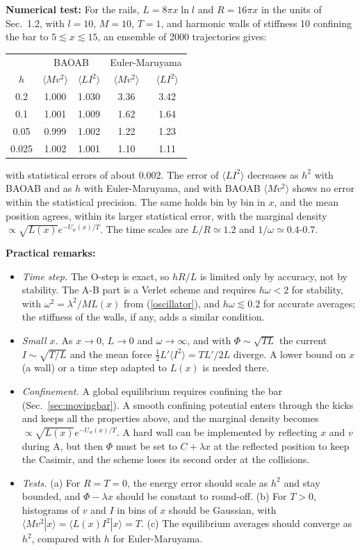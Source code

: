 \documentclass[11pt]{article}
\begin{document}
{\bf Numerical test:} For the rails, $L=8\pi x\ln l$ and $R=16\pi x$ in the units of Sec.~1.2, with $l=10$, $M=10$, $T=1$, and harmonic walls of stiffness 10 confining the bar to $5\lesssim x\lesssim15$, an ensemble of 2000 trajectories gives:
\begin{center}
\begin{tabular}{c|cc|cc}
  & \multicolumn{2}{c|}{BAOAB} & \multicolumn{2}{c}{Euler-Maruyama}\\
  $h$ & $\langle Mv^2\rangle$ & $\langle LI^2\rangle$ & $\langle Mv^2\rangle$ & $\langle LI^2\rangle$\\\hline
  0.2 & 1.000 & 1.030 & 3.36 & 3.42\\
  0.1 & 1.001 & 1.009 & 1.62 & 1.64\\
  0.05 & 0.999 & 1.002 & 1.22 & 1.23\\
  0.025 & 1.002 & 1.001 & 1.10 & 1.11
\end{tabular}
\end{center}
with statistical errors of about $0.002$. The error of $\langle LI^2\rangle$ decreases as $h^2$ with BAOAB and as $h$ with Euler-Maruyama, and with BAOAB $\langle Mv^2\rangle$ shows no error within the statistical precision. The same holds bin by bin in $x$, and the mean position agrees, within its larger statistical error, with the marginal density $\propto\sqrt{L(x)}e^{-U_w(x)/T}$. The time scales are $L/R\simeq1.2$ and $1/\omega\simeq0.4$-$0.7$.

{\bf Practical remarks:}
\begin{itemize}
\item {\it Time step.} The O-step is exact, so $hR/L$ is limited only by accuracy, not by stability. The A-B part is a Verlet scheme and requires $h\omega<2$ for stability, with $\omega^2=\lambda^2/ML(x)$ from (\ref{oscillator}), and $h\omega\lesssim0.2$ for accurate averages; the stiffness of the walls, if any, adds a similar condition.
\item {\it Small $x$.} As $x\to0$, $L\to0$ and $\omega\to\infty$, and with $\Phi\sim\sqrt{TL}$ the current $I\sim\sqrt{T/L}$ and the mean force $\frac{1}{2}L'\langle I^2\rangle=TL'/2L$ diverge. A lower bound on $x$ (a wall) or a time step adapted to $L(x)$ is needed there.
\item {\it Confinement.} A global equilibrium requires confining the bar (Sec.~\ref{sec:movingbar}). A smooth confining potential enters through the kicks and keeps all the properties above, and the marginal density becomes $\propto\sqrt{L(x)}e^{-U_w(x)/T}$. A hard wall can be implemented by reflecting $x$ and $v$ during A, but then $\Phi$ must be set to $C+\lambda x$ at the reflected position to keep the Casimir, and the scheme loses its second order at the collisions.
\item {\it Tests.} (a) For $R=T=0$, the energy error should scale as $h^2$ and stay bounded, and $\Phi-\lambda x$ should be constant to round-off. (b) For $T>0$, histograms of $v$ and $I$ in bins of $x$ should be Gaussian, with $\langle Mv^2|x\rangle=\langle L(x)I^2|x\rangle=T$. (c) The equilibrium averages should converge as $h^2$, compared with $h$ for Euler-Maruyama.
\end{itemize}
\end{document}
